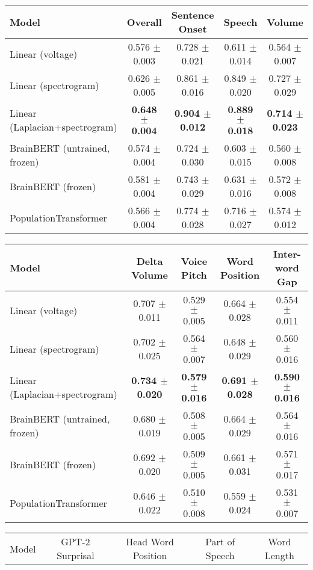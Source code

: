 \begin{table}[h]
\centering
\begin{tabular}{lcccc}
\hline
Model & Overall & Sentence Onset & Speech & Volume \\
\hline
Linear (voltage) & 0.576 $\pm$ 0.003 & 0.728 $\pm$ 0.021 & 0.611 $\pm$ 0.014 & 0.564 $\pm$ 0.007 \\
Linear (spectrogram) & 0.626 $\pm$ 0.005 & 0.861 $\pm$ 0.016 & 0.849 $\pm$ 0.020 & 0.727 $\pm$ 0.029 \\
Linear (Laplacian+spectrogram) & \textbf{0.648 $\pm$ 0.004} & \textbf{0.904 $\pm$ 0.012} & \textbf{0.889 $\pm$ 0.018} & \textbf{0.714 $\pm$ 0.023} \\
BrainBERT (untrained, frozen) & 0.574 $\pm$ 0.004 & 0.724 $\pm$ 0.030 & 0.603 $\pm$ 0.015 & 0.560 $\pm$ 0.008 \\
BrainBERT (frozen) & 0.581 $\pm$ 0.004 & 0.743 $\pm$ 0.029 & 0.631 $\pm$ 0.016 & 0.572 $\pm$ 0.008 \\
PopulationTransformer & 0.566 $\pm$ 0.004 & 0.774 $\pm$ 0.028 & 0.716 $\pm$ 0.027 & 0.574 $\pm$ 0.012 \\
\hline
\end{tabular}
\hspace{1em}
\begin{tabular}{lcccc}
\hline
Model & Delta Volume & Voice Pitch & Word Position & Inter-word Gap \\
\hline
Linear (voltage) & 0.707 $\pm$ 0.011 & 0.529 $\pm$ 0.005 & 0.664 $\pm$ 0.028 & 0.554 $\pm$ 0.011 \\
Linear (spectrogram) & 0.702 $\pm$ 0.025 & 0.564 $\pm$ 0.007 & 0.648 $\pm$ 0.029 & 0.560 $\pm$ 0.016 \\
Linear (Laplacian+spectrogram) & \textbf{0.734 $\pm$ 0.020} & \textbf{0.579 $\pm$ 0.016} & \textbf{0.691 $\pm$ 0.028} & \textbf{0.590 $\pm$ 0.016} \\
BrainBERT (untrained, frozen) & 0.680 $\pm$ 0.019 & 0.508 $\pm$ 0.005 & 0.664 $\pm$ 0.029 & 0.564 $\pm$ 0.016 \\
BrainBERT (frozen) & 0.692 $\pm$ 0.020 & 0.509 $\pm$ 0.005 & 0.661 $\pm$ 0.031 & 0.571 $\pm$ 0.017 \\
PopulationTransformer & 0.646 $\pm$ 0.022 & 0.510 $\pm$ 0.008 & 0.559 $\pm$ 0.024 & 0.531 $\pm$ 0.007 \\
\hline
\end{tabular}
\hspace{1em}
\begin{tabular}{lcccc}
\hline
Model & GPT-2 Surprisal & Head Word Position & Part of Speech & Word Length \\

\end{tabular}
\end{table}
